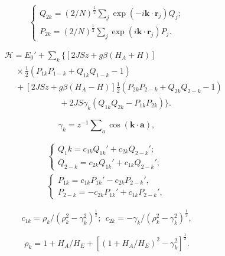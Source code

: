 \documentclass{article}
\begin{document}
\begin{equation} \label{eq:88}
\left\{
\begin{array}{l}
Q_{2k}=(2/N)^{\frac{1}{2}}\sum\nolimits_j\exp(-i\mathbf{k}\cdot\mathbf{r}_j)Q_j;\\
P_{2k}=(2/N)^{\frac{1}{2}}\sum\nolimits_j\exp(i\mathbf{k}\cdot\mathbf{r}_j)P_j.
\end{array}
\right.
\end{equation}

\begin{eqnarray} \label{eq:89}
&&\mathcal{H}=E_0'+\sum\nolimits_k\{[2JSz+g\beta(H_A+H)]\nonumber\\
&&~~~~~~\times\tfrac{1}{2}(P_{1k}P_{1-k}+Q_{1k}Q_{1-k}-1)\nonumber\\
&&~~~~~~+[2JSz+g\beta(H_A-H)]\tfrac{1}{2}(P_{2k}P_{2-k}+Q_{2k}Q_{2-k}-1)\nonumber\\
&&~~~~~~~~~~~~~~~~~~~~~~~~~~~~~~+2JS\gamma_k(Q_{1k}Q_{2k}-P_{1k}P_{2k})\}.
\end{eqnarray}


\begin{equation} \label{eq:90}
\gamma_k=z^{-1}\sum\nolimits_a\cos(\mathbf{k}\cdot\mathbf{a}),
\end{equation}

\begin{equation} \label{eq:91}
\begin{array}{l}
\left\{
\begin{array}{l}
Q_1k=c_{1k}Q_{1k}'+c_{2k}Q_{2-k}';\\
Q_{2-k}=c_{2k}Q_{1k}'+c_{1k}Q_{2-k}';
\end{array}
\right.\\
\left\{
\begin{array}{l}
P_{1k}=c_{1k}P_{1k}'-c_{2k}P_{2-k}',\\
P_{2-k}=-c_{2k}P_{1k}'+c_{1k}P_{2-k}',
\end{array}
\right.
\end{array}
\end{equation}

\begin{equation} \label{eq:92}
c_{1k}=\rho_k/(\rho_k^2-\gamma_k^2)^\frac{1}{2};~~c_{2k}=-\gamma_k/(\rho_k^2-\gamma_k^2)^\frac{1}{2},
\end{equation}

\begin{equation} \label{eq:93}
\rho_k=1+H_A/H_E+[(1+H_A/H_E)^2-\gamma_k^2]^\frac{1}{2}.
\end{equation}
\end{document}
